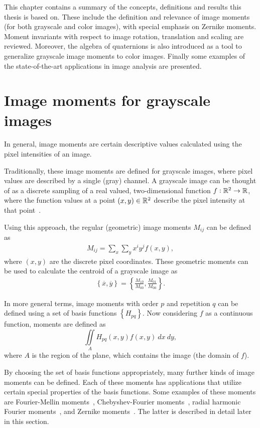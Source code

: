 This chapter contains a summary of the concepts, definitions and results this thesis is based on. These include the definition and relevance of image moments (for both grayscale and color images), with special emphasis on Zernike moments. Moment invariants with respect to image rotation, translation and scaling are reviewed.
Moreover, the algebra of quaternions is also introduced as a tool to generalize grayscale image moments to color images.
Finally some examples of the state-of-the-art applications in image analysis are presented.

\section{Image moments for grayscale images}\label{sec:grayscale}
In general, image moments are certain descriptive values calculated using the pixel intensities of an image. 

Traditionally, these image moments are defined for grayscale images, where pixel values are described by a single (gray) channel. A grayscale image can be thought of as a discrete sampling of a real valued, two-dimensional function $f : \mathbb{R}^2 \rightarrow \mathbb{R}$, where the function values at a point $(x,y) \in \mathbb{R}^2$ describe the pixel intensity at that point~\cite{moment_book}.

Using this approach, the regular (geometric) image moments $M_{ij}$ can be defined as
\begin{gather} \label{eq:regular_moment}
M_{ij} = \sum_x \sum_y x^iy^jf(x,y),
\end{gather} where $(x,y)$ are the discrete pixel coordinates.
These geometric moments can be used to calculate the centroid of a grayscale image as 
\begin{gather} \label{eq:centroid}
\left\{ \overline{x}, \overline{y} \right\} = \left\{ \frac{M_{10}}{M_{00}},  \frac{M_{01}}{M_{00}} \right\}.
\end{gather}

In more general terms, image moments with order $p$ and repetition $q$ can be defined using a set of basis functions $\left\{H_{pq}\right\}$. Now considering $f$ as a continuous function, moments are defined as
\begin{equation}\label{GeneralMoments}
\iint\limits_A H_{pq}(x,y)f(x,y)\ dx\ dy,
\end{equation} where $A$ is the region of the plane, which contains the image (the domain of $f$).

By choosing the set of basis functions appropriately, many further kinds of image moments can be defined. Each of these moments has applications that utilize certain special properties of the basis functions. Some examples of these moments are Fourier-Mellin moments~\cite{qfmm}, Chebyshev-Fourier moments~\cite{chebyshev-fourier}, radial harmonic Fourier moments~\cite{fourier}, and Zernike moments~\cite{zernike_moments}. The latter is described in detail later in this section.

